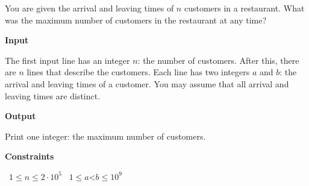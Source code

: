 You are given the arrival and leaving times of $n$ customers in a restaurant.
What was the maximum number of customers in the restaurant at any time?

\vspace{0.3cm}\noindent\textbf{Input}

The first input line has an integer $n$: the number of customers.
After this, there are $n$ lines that describe the customers. Each line has two integers $a$ and $b$: the arrival and leaving times of a customer.
You may assume that all arrival and leaving times are distinct.

\vspace{0.3cm}\noindent\textbf{Output}

Print one integer: the maximum number of customers.

\vspace{0.3cm}\noindent\textbf{Constraints}

\textbullet\ $1 \le n \le 2 \cdot 10^5$
\textbullet\ $1 \le a $<$ b \le 10^9$